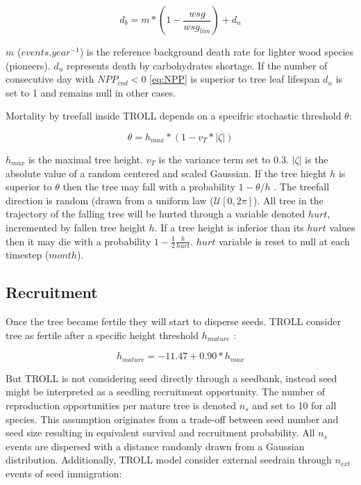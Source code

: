 \documentclass[12pt,]{article}
\theoremstyle{definition}
\theoremstyle{definition}
\theoremstyle{remark}
\begin{document}
\begin{equation}
  d_b = m*(1-\frac{wsg}{wsg_{lim}})+d_n
  \label{eq:db}
\end{equation}

\(m\) (\(events.year^{-1}\)) is the reference background death rate for
lighter wood species (pioneers). \(d_n\) represents death by
carbohydrates shortage. If the number of consecutive day with
\(NPP_{ind} < 0\) \eqref{eq:NPP} is superior to tree leaf lifespan \(d_n\)
is set to 1 and remains null in other cases.

Mortality by treefall inside TROLL depends on a specifric stochastic
threshold \(\theta\):

\begin{equation}
  \theta = h_{max}*(1-v_T*|\zeta|)
  \label{eq:theta}
\end{equation}

\(h_{max}\) is the maximal tree height. \(v_T\) is the variance term set
to 0.3. \(|\zeta|\) is the absolute value of a random centered and
scaled Gaussian. If the tree hieght \(h\) is superior to \(\theta\) then
the tree may fall with a probability \(1-\theta/h\) \citep{Chave1999}.
The treefall direction is random (drawn from a uniform law
(\(\mathcal{U}[0,2\pi]\)). All tree in the trajectory of the falling
tree will be hurted through a variable denoted \(hurt\), incremented by
fallen tree height \(h\). If a tree height is inferior than its \(hurt\)
values then it may die with a probability
\(1-\frac{1}{2}\frac{h}{hurt}\). \(hurt\) variable is reset to null at
each timestep (\(month\)).

\subsection{Recruitment}\label{recruitment}

Once the tree became fertile they will start to disperse seeds. TROLL
consider tree as fertile after a specific height threshold
\(h_{mature}\) \citep{Wright2005}:

\begin{equation}
  h_{mature} = -11.47+0.90*h_{max}
  \label{eq:hmature}
\end{equation}

But TROLL is not considering seed directly through a seedbank, instead
seed might be interpreted as a seedling recruitment opportunity. The
number of reproduction opportunities per mature tree is denoted \(n_s\)
and set to 10 for all species. This assumption originates from a
trade-off between seed number and seed size resulting in equivalent
survival and recruitment probability. All \(n_s\) events are dispersed
with a distance randomly drawn from a Gaussian distribution.
Additionally, TROLL model consider external seedrain through \(n_{ext}\)
events of seed immigration:
\end{document}
